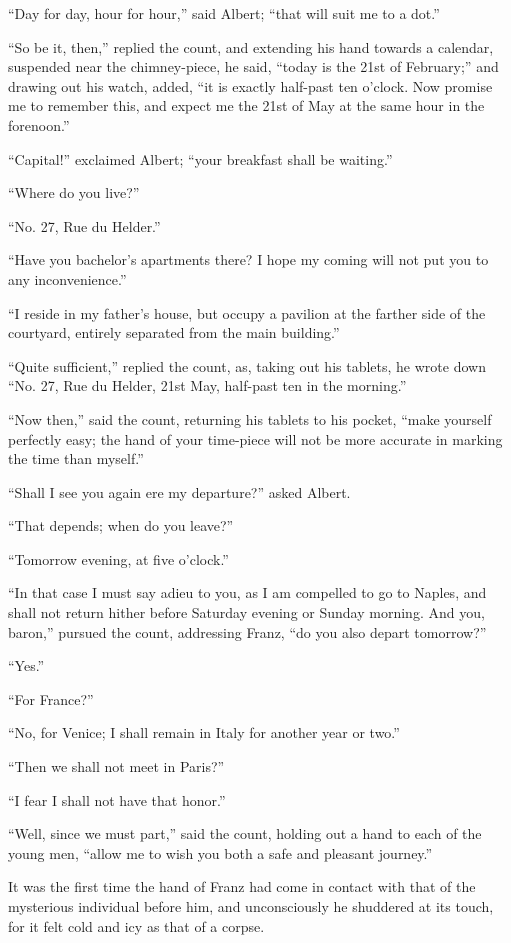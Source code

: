 “Day for day, hour for hour,” said Albert; “that will suit me to a
dot.”

“So be it, then,” replied the count, and extending his hand towards a
calendar, suspended near the chimney-piece, he said, “today is the 21st
of February;” and drawing out his watch, added, “it is exactly
half-past ten o’clock. Now promise me to remember this, and expect me
the 21st of May at the same hour in the forenoon.”

“Capital!” exclaimed Albert; “your breakfast shall be waiting.”

“Where do you live?”

“No. 27, Rue du Helder.”

“Have you bachelor’s apartments there? I hope my coming will not put
you to any inconvenience.”

“I reside in my father’s house, but occupy a pavilion at the farther
side of the courtyard, entirely separated from the main building.”

“Quite sufficient,” replied the count, as, taking out his tablets, he
wrote down “No. 27, Rue du Helder, 21st May, half-past ten in the
morning.”

“Now then,” said the count, returning his tablets to his pocket, “make
yourself perfectly easy; the hand of your time-piece will not be more
accurate in marking the time than myself.”

“Shall I see you again ere my departure?” asked Albert.

“That depends; when do you leave?”

“Tomorrow evening, at five o’clock.”

“In that case I must say adieu to you, as I am compelled to go to
Naples, and shall not return hither before Saturday evening or Sunday
morning. And you, baron,” pursued the count, addressing Franz, “do you
also depart tomorrow?”

“Yes.”

“For France?”

“No, for Venice; I shall remain in Italy for another year or two.”

“Then we shall not meet in Paris?”

“I fear I shall not have that honor.”

“Well, since we must part,” said the count, holding out a hand to each
of the young men, “allow me to wish you both a safe and pleasant
journey.”

It was the first time the hand of Franz had come in contact with that
of the mysterious individual before him, and unconsciously he shuddered
at its touch, for it felt cold and icy as that of a corpse.

